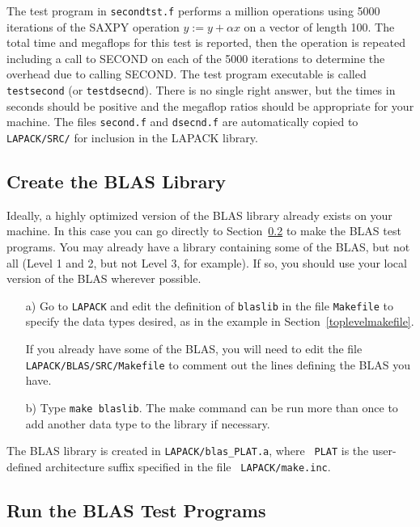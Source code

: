 The test program in {\tt secondtst.f}
performs a million operations using 5000 iterations of 
the SAXPY operation $y := y + \alpha x$ on a vector of length 100.
The total time and megaflops for this test is reported, then
the operation is repeated including a call to SECOND on each of
the 5000 iterations to determine the overhead due to calling SECOND.
The test program executable is called {\tt testsecond} (or {\tt testdsecnd}).
There is no single right answer, but the times
in seconds should be positive and the megaflop ratios should be 
appropriate for your machine.
The files {\tt second.f} and {\tt dsecnd.f} are automatically copied to
{\tt LAPACK/SRC/} for inclusion in the LAPACK library.

\subsection{Create the BLAS Library} 
\dent
Ideally, a highly optimized version of the BLAS library already
exists on your machine. 
In this case you can go directly to Section~\ref{testblas} to
make the BLAS test programs.  
You may already have a library containing some of the BLAS,
but not all (Level 1 and 2, but not Level 3, for example).
If so, you should use your local version of the BLAS wherever
possible.

\begin{itemize}
\item[a)]
Go to {\tt LAPACK} and edit the definition of {\tt blaslib} in the
file {\tt Makefile} to specify the data types desired, as in the example
in Section~\ref{toplevelmakefile}.

If you already have some of the BLAS, you will need to edit the file
{\tt LAPACK/BLAS/SRC/Makefile} to comment out the lines 
defining the BLAS you have.  

\item[b)]
Type {\tt make blaslib}.
The make command can be run more than once to add another
data type to the library if necessary.  
\end{itemize}

\noindent
The BLAS library is created in {\tt LAPACK/blas\_PLAT.a}, where {\tt
PLAT} is the user-defined architecture suffix specified in the file {\tt
LAPACK/make.inc}.

\subsection{Run the BLAS Test Programs}\label{testblas}

